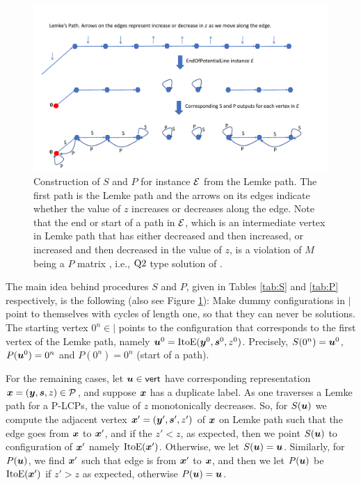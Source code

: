 \begin{figure}[htbp]
   \centering
\vspace{-1cm}

  \includegraphics[width=\textwidth]{plcp-fig.pdf}
 \caption{Construction of $S$ and $P$ for \EOPL instance $\mbox{${\mathcal E}$}$ from the Lemke
 	path. The first path is the Lemke path and the arrows on its edges indicate
 	whether the value of $z$ increases or decreases along the edge.  Note that
 	the end or start of a path in $\mbox{${\mathcal E}$}$, which is an intermediate vertex in
 	Lemke path that has either decreased and then increased, or increased and then
 	decreased in the value of $z$, is a violation of $M$ being a $P$ matrix
 	\cite{cottle2009linear}, i.e., $\mbox{Q2}$ type solution of
 	\PLCP.}
 	\label{fig:path}
\end{figure}   


The main idea behind procedures $S$ and $P$, given in Tables \ref{tab:S} and
\ref{tab:P} respectively, is the following (also see Figure \ref{fig:path}):
Make dummy configurations in $\vert$ point to themselves with cycles of
length one, so that they can never be solutions. 
The starting vertex $0^n \in \vert$ points to the configuration that corresponds
to the first vertex of the Lemke path, namely $\mbox{\boldmath $u$}^0=\mbox{ItoE}(\mbox{\boldmath $y$}^0,\mbox{\boldmath $s$}^0,z^0)$. 
Precisely, $S(0^n)=\mbox{\boldmath $u$}^0$, $P(\mbox{\boldmath $u$}^0)=0^n$ and $P(0^n)=0^n$ (start of
a path). 

For the remaining cases, let $\mbox{\boldmath $u$}\in \operatorname{\mathsf{vert}}$ have corresponding representation
$\mbox{\boldmath $x$}=(\mbox{\boldmath $y$},\mbox{\boldmath $s$},z)\in \mbox{${\mathcal P}$}$, and suppose $\mbox{\boldmath $x$}$ has a duplicate label. As one
traverses a Lemke path for a P-LCPs, the value of $z$ monotonically decreases.
So, for $S(\mbox{\boldmath $u$})$ we compute the adjacent vertex $\mbox{\boldmath $x$}'=(\mbox{\boldmath $y$}',\mbox{\boldmath $s$}',z')$ of $\mbox{\boldmath $x$}$
on Lemke path such that the edge goes from $\mbox{\boldmath $x$}$ to $\mbox{\boldmath $x$}'$, and if the $z'<z$,
as expected, then we point $S(\mbox{\boldmath $u$})$ to configuration of $\mbox{\boldmath $x$}'$ namely
$\mbox{ItoE}(\mbox{\boldmath $x$}')$. Otherwise, we let $S(\mbox{\boldmath $u$})=\mbox{\boldmath $u$}$. Similarly, for $P(\mbox{\boldmath $u$})$, we find
$\mbox{\boldmath $x$}'$ such that edge is from $\mbox{\boldmath $x$}'$ to $\mbox{\boldmath $x$}$, and then we let $P(\mbox{\boldmath $u$})$ be
$\mbox{ItoE}(\mbox{\boldmath $x$}')$ if $z'>z$ as expected, otherwise $P(\mbox{\boldmath $u$})=\mbox{\boldmath $u$}$. 


